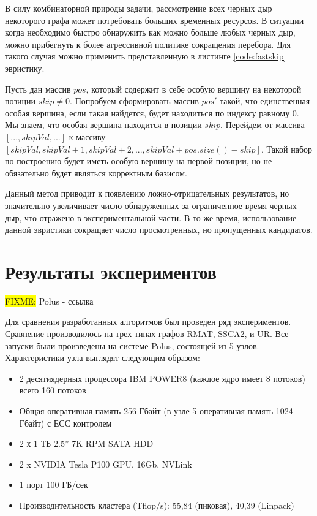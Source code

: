 \documentclass[12pt,a4paper,oneside,openany]{article}
\newcommand{\FIXME}[1]{ %
	\colorbox{yellow}{FIXME:} #1
}
\theoremstyle{definition}
\theoremstyle{lemma}
\theoremstyle{remark}
\begin{document}
В силу комбинаторной природы задачи, рассмотрение всех черных дыр некоторого графа может
потребовать больших временных ресурсов. В ситуации когда необходимо быстро обнаружить
как можно больше любых черных дыр, можно прибегнуть к более агрессивной политике сокращения
перебора. Для такого случая можно применить представленную в листинге \ref{code:fastskip}
эвристику.

Пусть дан массив $pos$, который содержит в себе особую вершину на некоторой позиции $skip \neq 0$.
Попробуем сформировать массив $pos'$ такой, что единственная особая вершина, если такая найдется,
будет находиться по индексу равному $0$.
Мы знаем, что особая вершина  находится в позиции $skip$. Перейдем от массива $[..., skipVal, ...]$ к массиву
$[skipVal, skipVal + 1, skipVal + 2, ... , skipVal + pos.size() - skip]$.
Такой набор по построению будет иметь особую вершину на первой позиции, но не обязательно будет являться корректным базисом.

Данный метод приводит к появлению ложно-отрицательных результатов, но значительно увеличивает число обнаруженных за
ограниченное время черных дыр, что отражено в экспериментальной части. В то же время, использование данной эвристики
сокращает число просмотренных, но пропущенных кандидатов.

\cleardoublepage
\section{Результаты экспериментов}\label{sec:experimentalresults}

\FIXME{Polus - ссылка}

Для сравнения разработанных алгоритмов был проведен ряд экспериментов.
Сравнение производилось на трех типах графов RMAT, SSCA2, и UR.
Все запуски были произведены на системе Polus, состоящей из 5 узлов.
Характеристики узла выглядят следующим образом:
\begin{itemize}
\item 2 десятиядерных процессора IBM POWER8 (каждое ядро имеет 8 потоков) всего 160 потоков
\item Общая оперативная память 256 Гбайт (в узле 5 оперативная память 1024 Гбайт) с ЕСС контролем
\item 2 х 1 ТБ 2.5” 7K RPM SATA HDD
\item 2 x NVIDIA Tesla P100 GPU, 16Gb, NVLink
\item 1 порт 100 ГБ/сек
\item Производительность кластера (Tflop/s): 55,84 (пиковая), 40,39 (Linpack)
\end{itemize}
\end{document}

